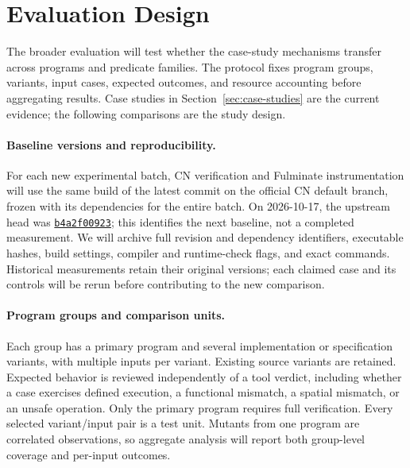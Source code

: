 \section{Evaluation Design}
\label{sec:evaluation}
The broader evaluation will test whether the case-study mechanisms transfer
across programs and predicate families. The protocol fixes program groups,
variants, input cases, expected outcomes, and resource accounting before
aggregating results. Case studies in Section~\ref{sec:case-studies} are the
current evidence; the following comparisons are the study design.

\paragraph{Baseline versions and reproducibility.}
For each new experimental batch, CN verification and Fulminate instrumentation
will use the same build of the latest commit on the official CN default branch,
frozen with its dependencies for the entire batch. On 2026-10-17, the upstream
head was \href{https://github.com/rems-project/cn/commit/b4a2f009234d9c80380dbf95a9b2325e36a4705d}{\texttt{b4a2f00923}};
this identifies the next baseline, not a completed measurement.
We will archive full revision and dependency identifiers, executable hashes,
build settings, compiler and runtime-check flags, and exact commands.
Historical measurements retain their original versions; each claimed case and
its controls will be rerun before contributing to the new comparison.

\paragraph{Program groups and comparison units.}
Each group has a primary program and several implementation or specification
variants, with multiple inputs per variant. Existing source variants are
retained. Expected behavior is reviewed independently of a tool verdict,
including whether a case exercises defined execution, a functional mismatch,
a spatial mismatch, or an unsafe operation. Only the primary program requires
full verification. Every selected variant/input pair is a test unit.
Mutants from one program are correlated observations, so aggregate analysis
will report both group-level coverage and per-input outcomes.

